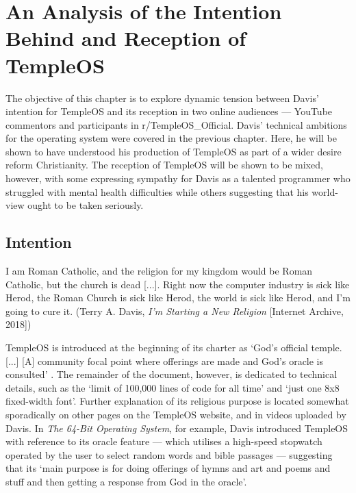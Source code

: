 \documentclass[Draft.tex]{subfiles}
\begin{document}
\chapter{An Analysis of the Intention Behind and Reception of TempleOS}

The objective of this chapter is to explore dynamic tension between Davis'
intention for TempleOS and its reception in two online audiences ---
YouTube commentors and participants in r/TempleOS\_Official.
Davis' technical ambitions for the operating system were covered in the
previous chapter.
Here, he will be shown to have understood his production of TempleOS
as part of a wider desire reform Christianity.
The reception of TempleOS will be shown to be mixed, however,
with some expressing sympathy for Davis as a talented programmer who
struggled with mental health difficulties while others suggesting that
his world-view ought to be taken seriously.

\section*{Intention}

\begin{displayquote}
  I am Roman Catholic, and the religion for my kingdom
  would be Roman Catholic, but the church is dead [...].
  Right now the computer industry is sick like Herod,
  the Roman Church is sick like Herod,
  the world is sick like Herod, and I'm going to cure it.
	(Terry A. Davis, \textit{I'm Starting a New Religion} [Internet Archive, 2018])
\end{displayquote}

TempleOS is introduced at the beginning of its charter as
`God's official temple. [...] [A] community focal point
where offerings are made and God's oracle is consulted' \parencite{Charter}.
The remainder of the document, however, is dedicated to technical details,
such as the `limit of 100,000 lines of code for all time'
and `just one 8x8 fixed-width font'.
Further explanation of its religious purpose is located somewhat sporadically
on other pages on the TempleOS website, and in videos uploaded by Davis.
In \textit{The 64-Bit Operating System}, for example,
Davis \parencite*{64-Bit} introduced TempleOS
with reference to its oracle feature --- which utilises a high-speed
stopwatch operated by the user to select random words and bible passages ---
suggesting that its `main purpose is for doing offerings of hymns and art
and poems and stuff and then getting a response from God in the oracle'.
\end{document}
